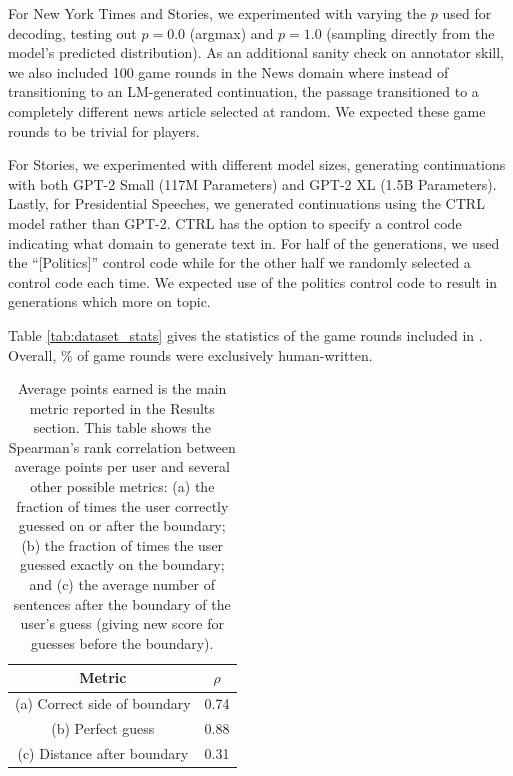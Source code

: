 For New York Times and Stories, we experimented with varying the $p$ used for decoding, testing out $p=0.0$ (argmax) and $p=1.0$ (sampling directly from the model's predicted distribution).
As an additional sanity check on annotator skill, we also included 100 game rounds in the News domain where instead of transitioning to an LM-generated continuation, the passage transitioned to a completely different news article selected at random.
We expected these game rounds to be trivial for players.


For Stories, we experimented with different model sizes, generating continuations with both GPT-2 Small (117M Parameters) and GPT-2 XL (1.5B Parameters).
Lastly, for Presidential Speeches, we generated continuations using the CTRL model \citep{keskar2019ctrl} rather than GPT-2.
CTRL has the option to specify a control code indicating what domain to generate text in. For half of the generations, we used the ``[Politics]'' control code while for the other half we randomly selected a control code each time.
We expected use of the politics control code to result in generations which more on topic.

Table \ref{tab:dataset_stats} gives the statistics of the game rounds included in \ROFT{}.
Overall, \TODO{}\% of game rounds were exclusively human-written.





\begin{table}
    \centering
    \small
    \begin{tabular}{c|c}
    \toprule
    Metric & $\rho$ \\
    \midrule
    (a) Correct side of boundary &  0.74 \\
    (b) Perfect guess & 0.88 \\
    (c) Distance after boundary & 0.31  \\
    \bottomrule
    \end{tabular}
    \caption{Average points earned is the main metric reported in the Results section. This table shows the Spearman's rank correlation between average points per user and several other possible metrics: (a) the fraction of times the user correctly guessed on or after the boundary; (b) the fraction of times the user guessed exactly on the boundary; and (c) the average number of sentences after the boundary of the user's guess (giving new score for guesses before the boundary).}
    \label{tab:correlations_with_other_metrucs}
\end{table}

